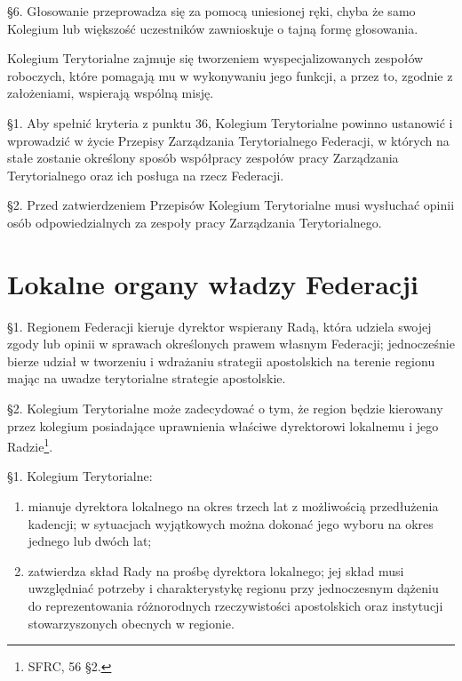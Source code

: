 \S{}6. Głosowanie przeprowadza się za pomocą uniesionej ręki, chyba że samo Kolegium lub większość uczestników zawnioskuje o tajną formę głosowania.


 Kolegium Terytorialne zajmuje się tworzeniem wyspecjalizowanych zespołów roboczych, które pomagają mu w wykonywaniu jego funkcji, a przez to, zgodnie z założeniami, wspierają wspólną misję.


 \S{}1. Aby spełnić kryteria z punktu 36, Kolegium Terytorialne powinno ustanowić i wprowadzić w życie Przepisy Zarządzania Terytorialnego Federacji, w których na stałe zostanie określony sposób współpracy zespołów pracy Zarządzania Terytorialnego oraz ich posługa na rzecz Federacji.

\S{}2. Przed zatwierdzeniem Przepisów Kolegium Terytorialne musi wysłuchać opinii osób odpowiedzialnych za zespoły pracy Zarządzania Terytorialnego.

\chapter{Lokalne organy władzy Federacji}


 \S{}1. Regionem Federacji kieruje dyrektor wspierany Radą, która udziela swojej zgody lub opinii w sprawach określonych prawem własnym Federacji; jednocześnie bierze udział w tworzeniu i wdrażaniu strategii apostolskich na terenie regionu mając na uwadze terytorialne strategie apostolskie.

\S{}2. Kolegium Terytorialne może zadecydować o tym, że region będzie kierowany przez kolegium posiadające uprawnienia właściwe dyrektorowi lokalnemu i jego Radzie\footnote{SFRC, 56 \S{}2.}.

\filbreak{}

 \S{}1. Kolegium Terytorialne:
\begin{enumerate}
	
	\item mianuje dyrektora lokalnego na okres trzech lat z możliwością przedłużenia kadencji; w sytuacjach wyjątkowych można dokonać jego wyboru na okres jednego lub dwóch lat;
	
	\item zatwierdza skład Rady na prośbę dyrektora lokalnego; jej skład musi uwzględniać potrzeby i charakterystykę regionu przy jednoczesnym dążeniu do reprezentowania różnorodnych rzeczywistości apostolskich oraz instytucji stowarzyszonych obecnych w regionie. 
\end{enumerate}

